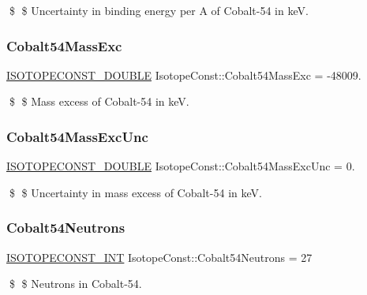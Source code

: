 \$ \$ Uncertainty in binding energy per A of Cobalt-\/54 in keV. \mbox{\label{group___isotope_const-_cobalt-_co54_ga0fdecb4aae12a7dc13ac787afb2917a1}} 
\subsubsection{\texorpdfstring{Cobalt54\+Mass\+Exc}{Cobalt54MassExc}}
{\footnotesize\ttfamily \mbox{\hyperlink{group___isotope_const-_macros_ga8f45a7272ce02c0b4c65c44636ed719a}{I\+S\+O\+T\+O\+P\+E\+C\+O\+N\+S\+T\+\_\+\+D\+O\+U\+B\+LE}} Isotope\+Const\+::\+Cobalt54\+Mass\+Exc = -\/48009.}

\$ \$ Mass excess of Cobalt-\/54 in keV. \mbox{\label{group___isotope_const-_cobalt-_co54_gac0f16dce8a2ceaa2545490610eef9ef9}} 
\subsubsection{\texorpdfstring{Cobalt54\+Mass\+Exc\+Unc}{Cobalt54MassExcUnc}}
{\footnotesize\ttfamily \mbox{\hyperlink{group___isotope_const-_macros_ga8f45a7272ce02c0b4c65c44636ed719a}{I\+S\+O\+T\+O\+P\+E\+C\+O\+N\+S\+T\+\_\+\+D\+O\+U\+B\+LE}} Isotope\+Const\+::\+Cobalt54\+Mass\+Exc\+Unc = 0.}

\$ \$ Uncertainty in mass excess of Cobalt-\/54 in keV. \mbox{\label{group___isotope_const-_cobalt-_co54_ga5bce8fc322dd45ec0310e49514c6e6ec}} 
\subsubsection{\texorpdfstring{Cobalt54\+Neutrons}{Cobalt54Neutrons}}
{\footnotesize\ttfamily \mbox{\hyperlink{group___isotope_const-_macros_ga5f18360b3e99483a35c32d789e62621c}{I\+S\+O\+T\+O\+P\+E\+C\+O\+N\+S\+T\+\_\+\+I\+NT}} Isotope\+Const\+::\+Cobalt54\+Neutrons = 27}

\$ \$ Neutrons in Cobalt-\/54. \mbox{\label{group___isotope_const-_cobalt-_co54_gaba4b7c7ce3abd41d7bd558b2879605fd}} 
